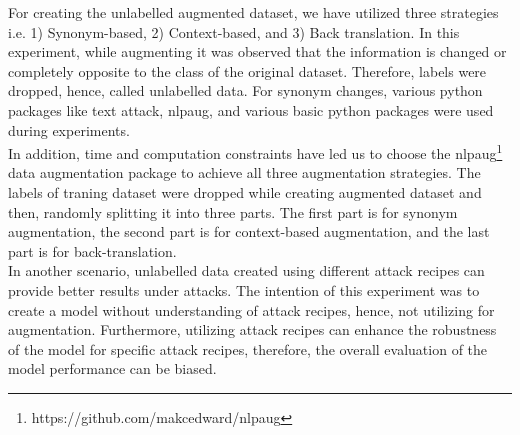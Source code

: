\documentclass[%
	BCOR=8mm, %
	DIV=12,
	toc=bibliography, %
	toc=listof, %
	oneside, %
	egregdoesnotlikesansseriftitles, %
	]{scrbook}
\begin{document}
For creating the unlabelled augmented dataset, we have utilized three strategies i.e. 1) Synonym-based, 2) Context-based, and 3) Back translation.
In this experiment, while augmenting it was observed that the information is changed or completely opposite to the class of the original dataset. Therefore, labels were dropped, hence, called unlabelled data. 
For synonym changes, various python packages like text attack, nlpaug, and various basic python packages were used during experiments.\\
In addition, time and computation constraints have led us to choose the nlpaug\footnote{https://github.com/makcedward/nlpaug} data augmentation package  to achieve all three augmentation strategies. The labels of traning dataset were dropped while creating augmented dataset and then, randomly splitting it into three parts. The first part is for synonym augmentation, the second part is for context-based augmentation, and the last part is for back-translation. \\
In another scenario, unlabelled data created using different attack recipes can provide better results under attacks. The intention of this experiment was to create a model without understanding of attack recipes, hence, not utilizing for augmentation. Furthermore, utilizing attack recipes can enhance the robustness of the model for specific attack recipes, therefore,  the overall evaluation of the model performance can be biased.
\end{document}
